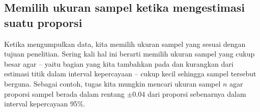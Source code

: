 
\subsection{Memilih ukuran sampel ketika mengestimasi suatu proporsi}


Ketika mengumpulkan data, kita memilih ukuran sampel yang sesuai
dengan tujuan penelitian.
Sering kali hal ini berarti memilih ukuran sampel yang cukup
besar agar  --
yaitu bagian yang kita tambahkan pada dan kurangkan dari estimasi
titik dalam interval kepercayaan --
cukup kecil sehingga sampel tersebut berguna.
Sebagai contoh, tugas kita mungkin mencari ukuran sampel
$n$ agar proporsi sampel berada dalam rentang $\pm 0.04$
dari proporsi sebenarnya dalam interval kepercayaan 95\%.



